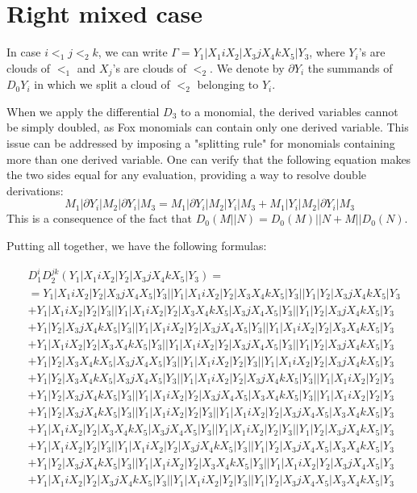 \documentclass{article}[12pt]
\begin{document}
\section*{Right mixed case}
In case $i<_1 j <_2 k$, we can write  $\Gamma = Y_1|X_1 i X_2 | X_3 j X_4 k X_5 | Y_3$, where $Y_i$'s are clouds of $<_1$ and $X_j$'s are clouds of $<_2$. We denote by $\partial Y_i$ the summands of $D_0 Y_i$ in which we split a cloud of $<_2$ belonging to $Y_i$.

When we apply the differential $D_3$ to a monomial, the derived variables cannot be simply doubled, as Fox monomials can contain only one derived variable. This issue can be addressed by imposing a "splitting rule" for monomials containing more than one derived variable. One can verify that the following equation makes the two sides equal for any evaluation, providing a way to resolve double derivations:
$$ M_1|\partial Y_i | M_2 | \partial Y_i |M_3 = M_1|\partial Y_i | M_2 | Y_i |M_3 + M_1|Y_i | M_2 | \partial Y_i |M_3 $$
This is a consequence of the fact that $D_0(M||N)=D_0(M)||N + M||D_0(N)$. 

Putting all together, we have the following formulas:

\begin{align*}
& D_1^iD_2^{jk}(Y_1|X_1iX_2|Y_2|X_3jX_4kX_5|Y_3) =\\
& =Y_1|X_1iX_2|Y_2|X_3jX_4X_5|Y_3||Y_1|X_1iX_2|Y_2|X_3X_4kX_5|Y_3||Y_1|Y_2|X_3jX_4kX_5|Y_3\\ 
 & +Y_1|X_1iX_2|Y_2|Y_3||Y_1|X_1iX_2|Y_2|X_3X_4kX_5|X_3jX_4X_5|Y_3||Y_1|Y_2|X_3jX_4kX_5|Y_3\\ 
 & +Y_1|Y_2|X_3jX_4kX_5|Y_3||Y_1|X_1iX_2|Y_2|X_3jX_4X_5|Y_3||Y_1|X_1iX_2|Y_2|X_3X_4kX_5|Y_3\\ 
 & +Y_1|X_1iX_2|Y_2|X_3X_4kX_5|Y_3||Y_1|X_1iX_2|Y_2|X_3jX_4X_5|Y_3||Y_1|Y_2|X_3jX_4kX_5|Y_3\\ 
 & +Y_1|Y_2|X_3X_4kX_5|X_3jX_4X_5|Y_3||Y_1|X_1iX_2|Y_2|Y_3||Y_1|X_1iX_2|Y_2|X_3jX_4kX_5|Y_3\\ 
 & +Y_1|Y_2|X_3X_4kX_5|X_3jX_4X_5|Y_3||Y_1|X_1iX_2|Y_2|X_3jX_4kX_5|Y_3||Y_1|X_1iX_2|Y_2|Y_3\\ 
 & +Y_1|Y_2|X_3jX_4kX_5|Y_3||Y_1|X_1iX_2|Y_2|X_3jX_4X_5|X_3X_4kX_5|Y_3||Y_1|X_1iX_2|Y_2|Y_3\\ 
 & +Y_1|Y_2|X_3jX_4kX_5|Y_3||Y_1|X_1iX_2|Y_2|Y_3||Y_1|X_1iX_2|Y_2|X_3jX_4X_5|X_3X_4kX_5|Y_3\\ 
 & +Y_1|X_1iX_2|Y_2|X_3X_4kX_5|X_3jX_4X_5|Y_3||Y_1|X_1iX_2|Y_2|Y_3||Y_1|Y_2|X_3jX_4kX_5|Y_3\\ 
 & +Y_1|X_1iX_2|Y_2|Y_3||Y_1|X_1iX_2|Y_2|X_3jX_4kX_5|Y_3||Y_1|Y_2|X_3jX_4X_5|X_3X_4kX_5|Y_3\\ 
 & +Y_1|Y_2|X_3jX_4kX_5|Y_3||Y_1|X_1iX_2|Y_2|X_3X_4kX_5|Y_3||Y_1|X_1iX_2|Y_2|X_3jX_4X_5|Y_3\\ 
 & +Y_1|X_1iX_2|Y_2|X_3jX_4kX_5|Y_3||Y_1|X_1iX_2|Y_2|Y_3||Y_1|Y_2|X_3jX_4X_5|X_3X_4kX_5|Y_3\end{align*}
\end{document}
